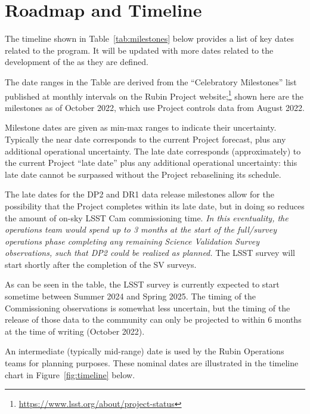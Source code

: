 \section{Roadmap and Timeline} \label{sec:timeline}

The timeline shown in Table~\ref{tab:milestones} below provides a list of key dates related to the \es program.
It will be updated with more dates related to the development of the \esp as they are defined.

The date ranges in the Table are derived from the ``Celebratory Milestones'' list published at monthly intervals on the Rubin Project website;\footnote{\url{https://www.lsst.org/about/project-status}} shown here are the milestones as of October 2022, which use Project controls data from August 2022.

Milestone dates are given as min-max ranges to indicate their uncertainty.
Typically the near date corresponds to the current Project forecast, plus any additional operational uncertainty.
The late date corresponds (approximately) to the current Project ``late date'' plus any additional operational uncertainty: this late date cannot be surpassed without the Project rebaselining its schedule.

The late dates for the DP2 and DR1 data release milestones allow for the possibility that the Project completes within its late date, but in doing so reduces the amount of on-sky LSST Cam commissioning time.
{\it In this eventuality, the operations team would spend up to 3 months at the start of the full/survey operations phase completing any remaining Science Validation Survey observations, such that DP2 could be realized as planned.}
The LSST survey will start shortly after the completion of the SV surveys.

As can be seen in the table, the LSST survey is currently expected to start sometime between Summer 2024 and Spring 2025.
The timing of the Commissioning observations is somewhat less uncertain, but the timing of the release of those data to the community can only be projected to within 6 months at the time of writing (October 2022).

An intermediate (typically mid-range) date is used by the Rubin Operations teams for planning purposes. These nominal dates are illustrated in the timeline chart in Figure~\ref{fig:timeline} below.

